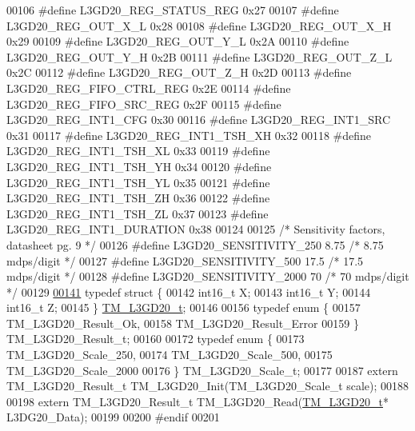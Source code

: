 \begin{DoxyCode}
00106 \textcolor{preprocessor}{#define L3GD20\_REG\_STATUS\_REG       0x27}
00107 \textcolor{preprocessor}{#define L3GD20\_REG\_OUT\_X\_L          0x28}
00108 \textcolor{preprocessor}{#define L3GD20\_REG\_OUT\_X\_H          0x29}
00109 \textcolor{preprocessor}{#define L3GD20\_REG\_OUT\_Y\_L          0x2A}
00110 \textcolor{preprocessor}{#define L3GD20\_REG\_OUT\_Y\_H          0x2B}
00111 \textcolor{preprocessor}{#define L3GD20\_REG\_OUT\_Z\_L          0x2C}
00112 \textcolor{preprocessor}{#define L3GD20\_REG\_OUT\_Z\_H          0x2D}
00113 \textcolor{preprocessor}{#define L3GD20\_REG\_FIFO\_CTRL\_REG    0x2E}
00114 \textcolor{preprocessor}{#define L3GD20\_REG\_FIFO\_SRC\_REG     0x2F}
00115 \textcolor{preprocessor}{#define L3GD20\_REG\_INT1\_CFG         0x30}
00116 \textcolor{preprocessor}{#define L3GD20\_REG\_INT1\_SRC         0x31}
00117 \textcolor{preprocessor}{#define L3GD20\_REG\_INT1\_TSH\_XH      0x32}
00118 \textcolor{preprocessor}{#define L3GD20\_REG\_INT1\_TSH\_XL      0x33}
00119 \textcolor{preprocessor}{#define L3GD20\_REG\_INT1\_TSH\_YH      0x34}
00120 \textcolor{preprocessor}{#define L3GD20\_REG\_INT1\_TSH\_YL      0x35}
00121 \textcolor{preprocessor}{#define L3GD20\_REG\_INT1\_TSH\_ZH      0x36}
00122 \textcolor{preprocessor}{#define L3GD20\_REG\_INT1\_TSH\_ZL      0x37}
00123 \textcolor{preprocessor}{#define L3GD20\_REG\_INT1\_DURATION    0x38}
00124 
00125 \textcolor{comment}{/* Sensitivity factors, datasheet pg. 9 */}
00126 \textcolor{preprocessor}{#define L3GD20\_SENSITIVITY\_250      8.75    }\textcolor{comment}{/* 8.75 mdps/digit */}\textcolor{preprocessor}{}
00127 \textcolor{preprocessor}{#define L3GD20\_SENSITIVITY\_500      17.5    }\textcolor{comment}{/* 17.5 mdps/digit */}\textcolor{preprocessor}{}
00128 \textcolor{preprocessor}{#define L3GD20\_SENSITIVITY\_2000     70      }\textcolor{comment}{/* 70 mdps/digit */}\textcolor{preprocessor}{}
00129 
\hypertarget{tm__stm32f4__l3gd20_8h_source_l00141}{}\hyperlink{struct_t_m___l3_g_d20__t}{00141} \textcolor{keyword}{typedef} \textcolor{keyword}{struct }\{
00142     int16\_t X;
00143     int16\_t Y;
00144     int16\_t Z;
00145 \} \hyperlink{struct_t_m___l3_g_d20__t}{TM\_L3GD20\_t};
00146 
00156 \textcolor{keyword}{typedef} \textcolor{keyword}{enum} \{
00157     TM\_L3GD20\_Result\_Ok,
00158     TM\_L3GD20\_Result\_Error
00159 \} TM\_L3GD20\_Result\_t;
00160 
00172 \textcolor{keyword}{typedef} \textcolor{keyword}{enum} \{
00173     TM\_L3GD20\_Scale\_250,
00174     TM\_L3GD20\_Scale\_500,
00175     TM\_L3GD20\_Scale\_2000
00176 \} TM\_L3GD20\_Scale\_t;
00177 
00187 \textcolor{keyword}{extern} TM\_L3GD20\_Result\_t TM\_L3GD20\_Init(TM\_L3GD20\_Scale\_t scale);
00188 
00198 \textcolor{keyword}{extern} TM\_L3GD20\_Result\_t TM\_L3GD20\_Read(\hyperlink{struct_t_m___l3_g_d20__t}{TM\_L3GD20\_t}* L3DG20\_Data);
00199 
00200 \textcolor{preprocessor}{#endif}
00201 
\end{DoxyCode}
